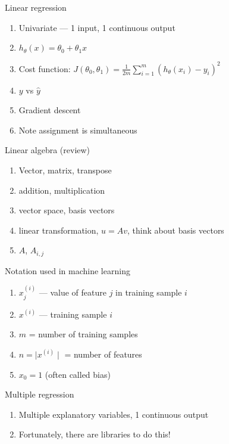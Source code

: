




Linear regression
\begin{enumerate}
\item Univariate --- 1 input, 1 continuous output
\item $h_\theta(x) = \theta_0 + \theta_1 x$
\item Cost function: $J(\theta_0, \theta_1) = \frac{1}{2m} \sum_{i=1}^m (h_\theta(x_i) - y_i)^2$
\item $y$ vs $\hat{y}$
\item Gradient descent
\item Note assignment is simultaneous
\end{enumerate}

Linear algebra (review)
\begin{enumerate}
\item Vector, matrix, transpose
\item addition, multiplication
\item vector space, basis vectors
\item linear transformation, $u=Av$, think about basis vectors
\item $A$, $A_{i,j}$
\end{enumerate}

Notation used in machine learning
\begin{enumerate}
\item $x_j^{(i)}$ --- value of feature $j$ in training sample $i$
\item $x^{(i)}$ --- training sample $i$
\item $m$ = number of training samples
\item $n = \mid x^{(i)} \mid$ = number of features
\item $x_0 = 1$ (often called bias)
\end{enumerate}

Multiple regression
\begin{enumerate}
\item Multiple explanatory variables, 1 continuous output
\item Fortunately, there are libraries to do this!
\end{enumerate}



